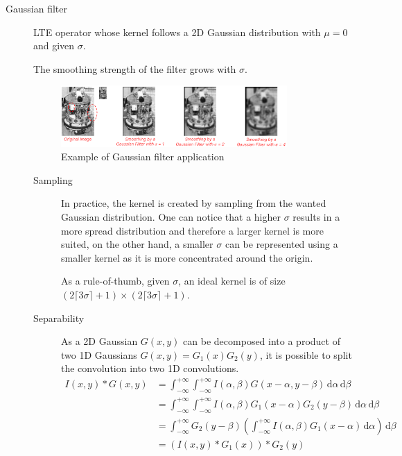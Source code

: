 \begin{description}
    \item[Gaussian filter] 
        LTE operator whose kernel follows a 2D Gaussian distribution with $\mu=0$ and given $\sigma$.

        \begin{remark}
            The smoothing strength of the filter grows with $\sigma$.
        \end{remark}

        \begin{figure}[H]
            \centering
            \includegraphics[width=0.85\textwidth]{./img/_gaussian_filter_example.pdf}
            \caption{Example of Gaussian filter application}
        \end{figure}

        \begin{description}
            \item[Sampling]
                In practice, the kernel is created by sampling from the wanted Gaussian distribution.
                One can notice that a higher $\sigma$ results in a more spread distribution and therefore a larger kernel is more suited,
                on the other hand, a smaller $\sigma$ can be represented using a smaller kernel as it is more concentrated around the origin.

                As a rule-of-thumb, given $\sigma$, an ideal kernel is of size $(2\lceil 3\sigma \rceil + 1) \times (2\lceil 3\sigma \rceil + 1)$.

            \item[Separability]
                As a 2D Gaussian $G(x, y)$ can be decomposed into a product of two 1D Gaussians $G(x, y) = G_1(x)G_2(y)$,
                it is possible to split the convolution into two 1D convolutions.
                \[ 
                    \begin{split}
                        I(x, y) * G(x, y) &= \int_{-\infty}^{+\infty}\int_{-\infty}^{+\infty} I(\alpha, \beta) G(x-\alpha, y-\beta) \,\text{d}\alpha\,\text{d}\beta \\
                            &= \int_{-\infty}^{+\infty}\int_{-\infty}^{+\infty} I(\alpha, \beta) G_1(x-\alpha)G_2(y-\beta) \,\text{d}\alpha\,\text{d}\beta \\
                            &= \int_{-\infty}^{+\infty} G_2(y-\beta) \left( \int_{-\infty}^{+\infty} I(\alpha, \beta) G_1(x-\alpha) \,\text{d}\alpha \right) \,\text{d}\beta \\
                            &= (I(x, y) * G_1(x)) * G_2(y)
                    \end{split}
                \]


\end{description}
\end{description}
